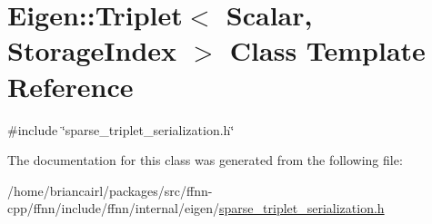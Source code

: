 \hypertarget{class_eigen_1_1_triplet}{\section{Eigen\-:\-:Triplet$<$ Scalar, Storage\-Index $>$ Class Template Reference}
\label{class_eigen_1_1_triplet}
}


{\ttfamily \#include \char`\"{}sparse\-\_\-triplet\-\_\-serialization.\-h\char`\"{}}



The documentation for this class was generated from the following file\-:\begin{DoxyCompactItemize}
\item 
/home/briancairl/packages/src/ffnn-\/cpp/ffnn/include/ffnn/internal/eigen/\hyperlink{sparse__triplet__serialization_8h}{sparse\-\_\-triplet\-\_\-serialization.\-h}\end{DoxyCompactItemize}

